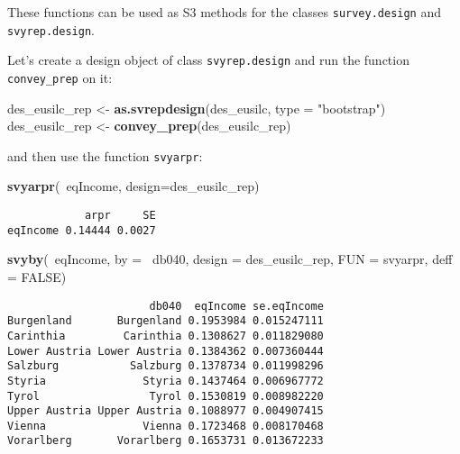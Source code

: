 \documentclass[]{book}
\newenvironment{Shaded}{\begin{snugshade}}{\end{snugshade}}
\newcommand{\KeywordTok}[1]{\textcolor[rgb]{0.13,0.29,0.53}{\textbf{{#1}}}}
\newcommand{\DataTypeTok}[1]{\textcolor[rgb]{0.13,0.29,0.53}{{#1}}}
\newcommand{\StringTok}[1]{\textcolor[rgb]{0.31,0.60,0.02}{{#1}}}
\newcommand{\OtherTok}[1]{\textcolor[rgb]{0.56,0.35,0.01}{{#1}}}
\newcommand{\NormalTok}[1]{{#1}}
\begin{document}
These functions can be used as S3 methods for the classes
\texttt{survey.design} and \texttt{svyrep.design}.

Let's create a design object of class \texttt{svyrep.design} and run the
function \texttt{convey\_prep} on it:

\begin{Shaded}
\begin{Highlighting}[]
\NormalTok{des_eusilc_rep <-}\StringTok{ }\KeywordTok{as.svrepdesign}\NormalTok{(des_eusilc, }\DataTypeTok{type =} \StringTok{"bootstrap"}\NormalTok{)}
\NormalTok{des_eusilc_rep <-}\StringTok{ }\KeywordTok{convey_prep}\NormalTok{(des_eusilc_rep) }
\end{Highlighting}
\end{Shaded}

and then use the function \texttt{svyarpr}:

\begin{Shaded}
\begin{Highlighting}[]
\KeywordTok{svyarpr}\NormalTok{(~eqIncome, }\DataTypeTok{design=}\NormalTok{des_eusilc_rep)}
\end{Highlighting}
\end{Shaded}

\begin{verbatim}
            arpr     SE
eqIncome 0.14444 0.0027
\end{verbatim}

\begin{Shaded}
\begin{Highlighting}[]
\KeywordTok{svyby}\NormalTok{(~eqIncome, }\DataTypeTok{by =} \NormalTok{~db040, }\DataTypeTok{design =} \NormalTok{des_eusilc_rep, }\DataTypeTok{FUN =} \NormalTok{svyarpr, }\DataTypeTok{deff =} \OtherTok{FALSE}\NormalTok{)}
\end{Highlighting}
\end{Shaded}

\begin{verbatim}
                      db040  eqIncome se.eqIncome
Burgenland       Burgenland 0.1953984 0.015247111
Carinthia         Carinthia 0.1308627 0.011829080
Lower Austria Lower Austria 0.1384362 0.007360444
Salzburg           Salzburg 0.1378734 0.011998296
Styria               Styria 0.1437464 0.006967772
Tyrol                 Tyrol 0.1530819 0.008982220
Upper Austria Upper Austria 0.1088977 0.004907415
Vienna               Vienna 0.1723468 0.008170468
Vorarlberg       Vorarlberg 0.1653731 0.013672233
\end{verbatim}
\end{document}
